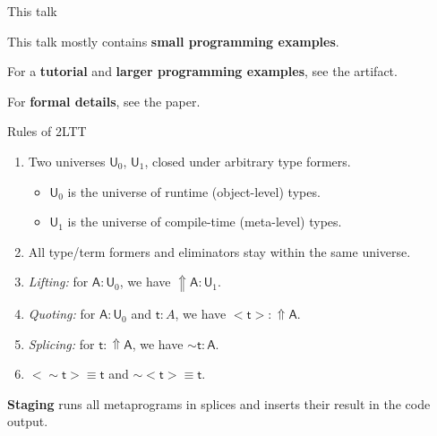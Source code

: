 \documentclass[dvipsnames,aspectratio=169]{beamer}
\newcommand{\msf}[1]{\mathsf{#1}}
\newcommand{\Lift}{{\Uparrow}}
\newcommand{\spl}{{\sim}}
\newcommand{\qut}[1]{{<}#1{>}}
\newcommand{\U}{\msf{U}}
\theoremstyle{remark}
\newcommand{\msA}{\msf{A}}
\newcommand{\mst}{\msf{t}}
\begin{document}
\begin{frame}{This talk}

This talk mostly contains \textbf{small programming examples}.
\vspace{1em}
\pause

For a \textbf{tutorial} and \textbf{larger programming examples}, see the artifact.
\vspace{1em}
\pause

For \textbf{formal details}, see the paper.

\end{frame}

\begin{frame}{Rules of 2LTT}

  \begin{enumerate}
    \item Two universes $\U_0$, $\U_1$, closed under arbitrary type formers.
      \begin{itemize}
        \item $\U_0$ is the universe of runtime (object-level) types.
        \item $\U_1$ is the universe of compile-time (meta-level) types.
      \end{itemize}
    \pause
    \item All type/term formers and eliminators stay within the same universe.
    \pause
    \item \emph{Lifting:} for $\msA : \U_0$, we have $\Lift \msA : \U_1$.
    \pause
    \item \emph{Quoting:} for $\msA : \U_0$ and $\mst : A$, we have $\qut{\mst} : \Lift \msA$.
    \pause
    \item \emph{Splicing:} for $\mst : \Lift \msA$, we have $\spl{\mst} : \msA$.
    \pause
    \item $\qut{\spl{\mst}} \equiv \mst$ and $\spl{\qut{\mst}} \equiv \mst$.
  \end{enumerate}
\vspace{1em}
\pause

\begin{block}{}
\textbf{Staging} runs all metaprograms in splices and inserts their result
in the code output.
\end{block}

\end{frame}
\end{document}
